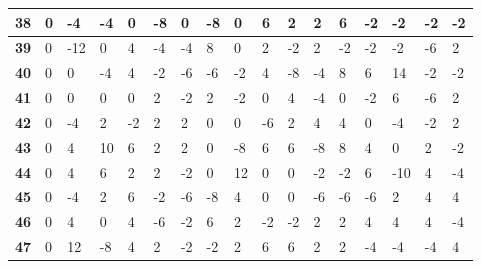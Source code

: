 \begin{longtable}[c]{|l|l|l|l|l|l|l|l|l|l|l|l|l|l|l|l|l|}
\textbf{38} & 0          & -4         & -4         & 0          & -8         & 0          & -8         & 0          & 6          & 2          & 2           & 6           & -2          & -2          & -2          & -2          \\ \hline
\textbf{39} & 0          & -12        & 0          & 4          & -4         & -4         & 8          & 0          & 2          & -2         & 2           & -2          & -2          & -2          & -6          & 2           \\ \hline
\textbf{40} & 0          & 0          & -4         & 4          & -2         & -6         & -6         & -2         & 4          & -8         & -4          & 8           & 6           & 14          & -2          & -2          \\ \hline
\textbf{41} & 0          & 0          & 0          & 0          & 2          & -2         & 2          & -2         & 0          & 4          & -4          & 0           & -2          & 6           & -6          & 2           \\ \hline
\textbf{42} & 0          & -4         & 2          & -2         & 2          & 2          & 0          & 0          & -6         & 2          & 4           & 4           & 0           & -4          & -2          & 2           \\ \hline
\textbf{43} & 0          & 4          & 10         & 6          & 2          & 2          & 0          & -8         & 6          & 6          & -8          & 8           & 4           & 0           & 2           & -2          \\ \hline
\textbf{44} & 0          & 4          & 6          & 2          & 2          & -2         & 0          & 12         & 0          & 0          & -2          & -2          & 6           & -10         & 4           & -4          \\ \hline
\textbf{45} & 0          & -4         & 2          & 6          & -2         & -6         & -8         & 4          & 0          & 0          & -6          & -6          & -6          & 2           & 4           & 4           \\ \hline
\textbf{46} & 0          & 4          & 0          & 4          & -6         & -2         & 6          & 2          & -2         & -2         & 2           & 2           & 4           & 4           & 4           & -4          \\ \hline
\textbf{47} & 0          & 12         & -8         & 4          & 2          & -2         & -2         & 2          & 6          & 6          & 2           & 2           & -4          & -4          & -4          & 4           \\ \hline

\end{longtable}
